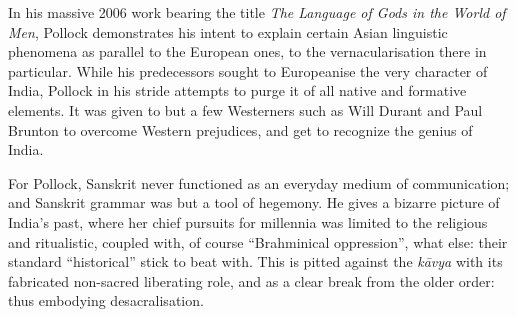\vskip 2pt

In his massive 2006 work bearing the title \textit{The Language of Gods in the World of Men}, Pollock demonstrates his intent to explain certain Asian linguistic phenomena as parallel to the European ones, to the vernacularisation there in particular. While his predecessors sought to Europeanise the very character of India, Pollock in his stride attempts to purge it of all native and formative elements. It was given to but a few Westerners such as Will Durant and Paul Brunton to overcome Western prejudices, and get to recognize the genius of India.

\vskip 2pt

For Pollock, Sanskrit never functioned as an everyday medium of communication; and Sanskrit grammar was but a tool of hegemony. He gives a bizarre picture of India’s past, where her chief pursuits for millennia was limited to the religious and ritualistic, coupled with, of course “Brahminical oppression”, what else: their standard “historical” stick to beat with. This is pitted against the \textit{kāvya} with its fabricated non-sacred liberating role, and as a clear break from the older order: thus embodying desacralisation.

\vskip 2pt

